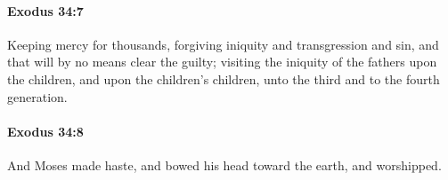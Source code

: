 		\paragraph{Exodus 34:7} %
			\label{EXODUS-34-7}

			Keeping mercy for thousands, forgiving iniquity and transgression and sin, and that will by no means clear the guilty; visiting the iniquity of the fathers upon the children, and upon the children's children, unto the third and to the fourth generation.


		\paragraph{Exodus 34:8} %
			\label{EXODUS-34-8}

			And Moses made haste, and bowed his head toward the earth, and worshipped.


